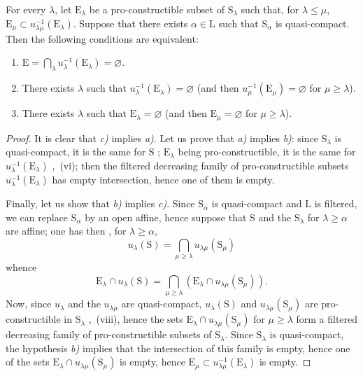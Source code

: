 \begin{corollary}[8.3.3]
\label{IV.8.3.3}
For every $\lambda$, let $\mathrm{E}_\lambda$ be a pro-constructible subset of $\mathrm{S}_\lambda$ such that, for $\lambda\leqslant\mu$, $\mathrm{E}_\mu\subset u_{\lambda\mu}^{-1}(\mathrm{E}_\lambda)$.
Suppose that there exists $\alpha\in\mathrm{L}$ such that $\mathrm{S}_\alpha$ is quasi-compact.
Then the following conditions are equivalent:
\begin{enumerate}[label=\emph{\alph*)}]
  \item $\mathrm{E}=\bigcap_\lambda u_\lambda^{-1}(\mathrm{E}_\lambda)=\varnothing$.
  \item There exists $\lambda$ such that $u_\lambda^{-1}(\mathrm{E}_\lambda)=\varnothing$ (and then $u_\mu^{-1}(\mathrm{E}_\mu)=\varnothing$ for $\mu\geqslant\lambda$).
  \item There exists $\lambda$ such that $\mathrm{E}_\lambda=\varnothing$ (and then $\mathrm{E}_\mu=\varnothing$ for $\mu\geqslant\lambda$).
\end{enumerate}
\end{corollary}

\begin{proof}
It is clear that \emph{c)} implies \emph{a)}.
Let us prove that \emph{a)} implies \emph{b)}: since $\mathrm{S}_\lambda$ is quasi-compact, it is the same for $\mathrm{S}$ ; $\mathrm{E}_\lambda$ being pro-constructible, it is the same for $u_\lambda^{-1}(\mathrm{E}_\lambda)$ ,~(vi); then the filtered decreasing family of pro-constructible subsets $u_\lambda^{-1}(\mathrm{E}_\lambda)$ has empty intersection, hence  one of them is empty.

Finally, let us show that \emph{b)} implies \emph{c)}.
Since $\mathrm{S}_\alpha$ is quasi-compact and $\mathrm{L}$ is filtered, we can replace $\mathrm{S}_\alpha$ by an open affine, hence suppose  that $\mathrm{S}$ and the $\mathrm{S}_\lambda$ for $\lambda\geqslant\alpha$ are affine; one has then , for $\lambda\geqslant\alpha$,
\[
  u_\lambda(\mathrm{S})=\bigcap_{\mu\geqslant\lambda}u_{\lambda\mu}(\mathrm{S}_\mu)
\]
whence
\[
  \mathrm{E}_\lambda\cap u_\lambda(\mathrm{S})=\bigcap_{\mu\geqslant\lambda}(\mathrm{E}_\lambda\cap u_{\lambda\mu}(\mathrm{S}_\mu)).
\]
Now, since $u_\lambda$ and the $u_{\lambda\mu}$ are quasi-compact, $u_\lambda(\mathrm{S})$ and $u_{\lambda\mu}(\mathrm{S}_\mu)$ are pro-constructible in $\mathrm{S}_\lambda$ ,~(viii), hence the sets $\mathrm{E}_\lambda\cap u_{\lambda\mu}(\mathrm{S}_\mu)$ for $\mu\geqslant\lambda$ form a filtered decreasing family of pro-constructible subsets of $\mathrm{S}_\lambda$.
Since $\mathrm{S}_\lambda$ is quasi-compact, the hypothesis \emph{b)} implies that the intersection of this family is empty, hence  one of the sets $\mathrm{E}_\lambda\cap u_{\lambda\mu}(\mathrm{S}_\mu)$ is empty, hence $\mathrm{E}_\mu\subset u_{\lambda\mu}^{-1}(\mathrm{E}_\lambda)$ is empty.
\end{proof}

